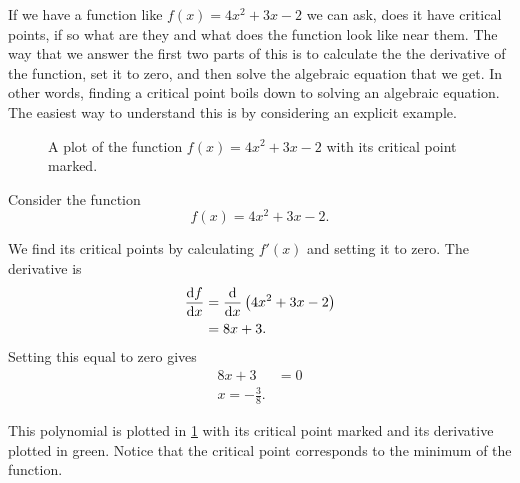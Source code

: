 If we have a function like $f(x)=4x^{2}+3x-2$ we can ask, does it have critical points, if so what are they and what does the function look like near them. The way that we answer the first two parts of this is to calculate the the derivative of the function, set it to zero, and then solve the algebraic equation that we get. In other words, finding a critical point boils down to solving an algebraic equation. The easiest way to understand this is by considering an explicit example. \\

\begin{figure}[ht]
    \centering
{}
    \caption{A plot of the function $f(x)=4x^{2}+3x-2$ with its critical point marked.}
        \label{fig: crit points 1}
\end{figure}

\begin{ex}
Consider the function
\begin{equation*}
f(x)=4x^{2}+3x-2.
\end{equation*}

We find its critical points by calculating $f'(x)$ and setting it to zero. The derivative is
\begin{align*}
\frac{\mathrm{d} f}{\mathrm{d} x}	&=\frac{\mathrm{d}}{\mathrm{d} x}\left(4x^{2}+3x-2\right)\\
			&=8x+3.
\end{align*}
Setting this equal to zero gives 
\begin{align*}
8x+3&=0\\
x=-\frac{3}{8}.
\end{align*}

This polynomial is plotted in \cref{fig: crit points 1} with its critical point marked and its derivative plotted in green. Notice that the critical point corresponds to the minimum of the function.
\end{ex}

